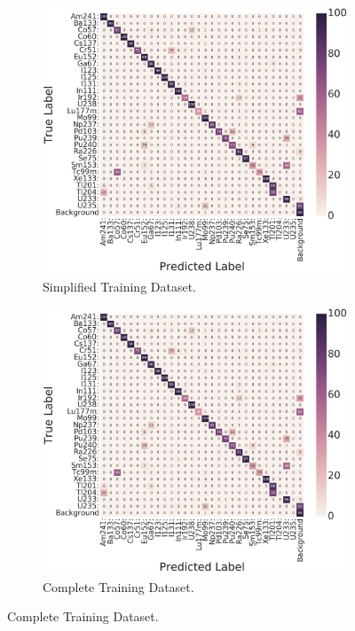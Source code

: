 \begin{figure}[H]
     \centering
     \begin{subfigure}[b]{0.49\textwidth}
         \centering
         \includegraphics[width=\textwidth]{model_choice_hyperparameter_search_images/conf_matrix_example.png}
         \caption{Simplified Training Dataset.}
         \label{fig:results_easy_distance_comparison_simple}
     \end{subfigure}
     \hfill
     \begin{subfigure}[b]{0.49\textwidth}
         \centering
         \includegraphics[width=\textwidth]{model_choice_hyperparameter_search_images/conf_matrix_example.png}
         \caption{Complete Training Dataset.}
         \label{fig:results_easy_distance_comparison_full}
     \end{subfigure}
     

\end{figure}
